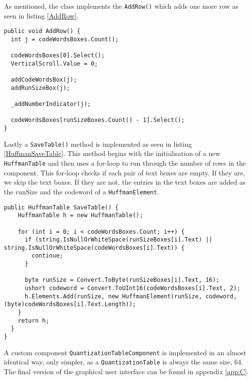 As mentioned, the class implements the \lstinline|AddRow()| which adds one more row as seen in listing \ref{AddRow}.

\begin{lstlisting}[firstnumber=78,label=AddRow, caption={\lstinline|AddRow()| method \textbf{File: }HuffmanTableComponent.cs}]
public void AddRow() {
  int j = codeWordsBoxes.Count();
  
  codeWordsBoxes[0].Select();
  VerticalScroll.Value = 0;
  
  addCodeWordsBox(j);
  addRunSizeBox(j);

  _addNumberIndicator(j);

  codeWordsBoxes[runSizeBoxes.Count() - 1].Select();
}
\end{lstlisting}

Lastly a \lstinline|SaveTable()| method is implemented as seen in listing \ref{HuffmanSaveTable}.
This method begins with the initialisation of a new \lstinline|HuffmanTable| and then uses a for-loop to run through the number of rows in the component.
This for-loop checks if each pair of text boxes are empty.
If they are, we skip the text boxes.
If they are not, the entries in the text boxes are added as the runSize and the codeword of a  \lstinline|HuffmanElement|. 

\begin{lstlisting}[firstnumber=135,label=HuffmanSaveTable, caption={Save method of the \lstinline|HuffmanTable| method \textbf{File: }HuffmanTableComponent.cs}]
public HuffmanTable SaveTable() {
    HuffmanTable h = new HuffmanTable();
    
    for (int i = 0; i < codeWordsBoxes.Count; i++) {
      if (string.IsNullOrWhiteSpace(runSizeBoxes[i].Text) || string.IsNullOrWhiteSpace(codeWordsBoxes[i].Text)) {
        continue;
      }
      
      byte runSize = Convert.ToByte(runSizeBoxes[i].Text, 16);
      ushort codeword = Convert.ToUInt16(codeWordsBoxes[i].Text, 2);
      h.Elements.Add(runSize, new HuffmanElement(runSize, codeword, (byte)codeWordsBoxes[i].Text.Length));
    }
    return h;
  }
}
\end{lstlisting}

A custom component \lstinline|QuantizationTableComponent| is implemented in an almost identical way, only simpler, as a \lstinline|QuantizationTable| is always the same size, 64.
The final version of the graphical user interface can be found in appendix \ref{app:C}.